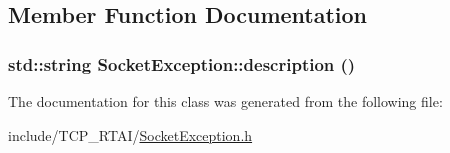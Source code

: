 \subsection{Member Function Documentation}
\hypertarget{classSocketException_ad7920caebddc99b6bbb7dbede569fa18}{
\subsubsection[{description}]{\setlength{\rightskip}{0pt plus 5cm}std::string SocketException::description ()}}
\label{classSocketException_ad7920caebddc99b6bbb7dbede569fa18}


The documentation for this class was generated from the following file:\begin{DoxyCompactItemize}
\item 
include/TCP\_\-RTAI/\hyperlink{SocketException_8h}{SocketException.h}\end{DoxyCompactItemize}
